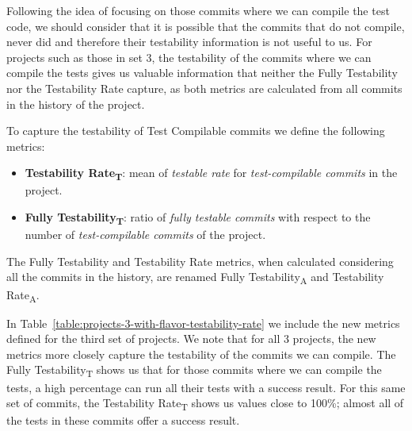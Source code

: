 Following the idea of focusing on those commits where we can compile the test code, we should consider that it is possible that the commits that do not compile, never did and therefore their testability information is not useful to us.
For projects such as those in set 3, the testability of the commits where we can compile the tests gives us valuable information that neither the Fully Testability nor the Testability Rate capture, as both metrics are calculated from all commits in the history of the project.

To capture the testability of Test Compilable commits we define the following metrics:
\begin{itemize}
    \item \textbf{Testability Rate\textsubscript{T}}: mean of \textit{testable rate} for \textit{test-compilable commits} in the project.
    \item \textbf{Fully Testability\textsubscript{T}}: ratio of \textit{fully testable commits} with respect to the number of \textit{test-compilable commits} of the project.
\end{itemize}
The Fully Testability and Testability Rate metrics, when calculated considering all the commits in the history, are renamed Fully Testability\textsubscript{A} and Testability Rate\textsubscript{A}.

In Table~\ref{table:projects-3-with-flavor-testability-rate} we include the new metrics defined for the third set of projects. 
We note that for all 3 projects, the new metrics more closely capture the testability of the commits we can compile.
The Fully Testability\textsubscript{T} shows us that for those commits where we can compile the tests, a high percentage can run all their tests with a success result. For this same set of commits, the Testability Rate\textsubscript{T} shows us values close to 100\%; almost all of the tests in these commits offer a success result.

